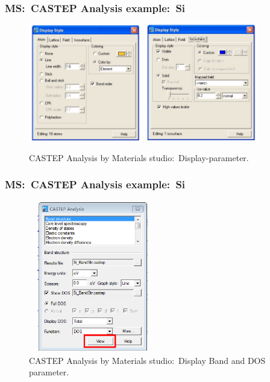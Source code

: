 \frame
{
	\frametitle{\textrm{MS:~CASTEP Analysis example:~Si}}
\begin{figure}[h!]
\centering
\includegraphics[height=2.00in,width=1.95in,viewport=0 0 810 820,clip]{Figures/MS-CASTEP-12-Si-Analysis-display-parameter-1.png}
\includegraphics[height=2.00in,width=1.95in,viewport=0 0 802 822,clip]{Figures/MS-CASTEP-12-Si-Analysis-display-parameter-2.png}
\caption{\tiny \textrm{CASTEP Analysis by Materials studio:~Display-parameter.}}%
\label{MS-CASTEP-Analysis-display-parameter}
\end{figure}
}

\frame
{
	\frametitle{\textrm{MS:~CASTEP Analysis example:~Si}}
\begin{figure}[h!]
\centering
\includegraphics[height=2.60in,width=2.20in,viewport=4 0 300 415,clip]{Figures/MS-CASTEP-14-Si-Analysis-Band_DOS-parameter.png}
\caption{\tiny \textrm{CASTEP Analysis by Materials studio:~Display Band and DOS parameter.}}%
\label{MS-CASTEP-Analysis-display-Band_DOS-parameter}
\end{figure}
}

